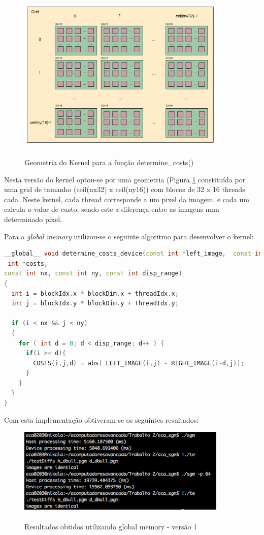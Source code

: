\documentclass[pdftex,12pt,a4paper]{report}
\begin{document}
\begin{figure}[!htb]
\center
 \includegraphics[width=100mm,scale=1]{DetermineCosts_v1_kernel.pdf}
 \caption{\\ Geometria do Kernel para a função determine\_costs()}
 \label{fig:DetermineCosts_v1_kernel}
\end{figure}

Nesta versão do kernel optou-se por uma geometria (Figura \ref{fig:DetermineCosts_v1_kernel}  constituída por uma grid de tamanho (ceil(nx\/32) x ceil(ny\/16)) com blocos de 32 x 16 threads cada.
Neste kernel, cada thread corresponde a um pixel da imagem, e cada um calcula o valor de custo, sendo este a diferença entre as imagens num determinado pixel.

Para a \textit{global memory} utilizou-se o seguinte algoritmo para desenvolver o kernel:

\begin{lstlisting}[language=c++, basicstyle=\scriptsize]
__global__ void determine_costs_device(const int *left_image,  const int *right_image,
 int *costs, 
const int nx, const int ny, const int disp_range)
{
  int i = blockIdx.x * blockDim.x + threadIdx.x;
  int j = blockIdx.y * blockDim.y + threadIdx.y;

  if (i < nx && j < ny)
  {
    for ( int d = 0; d < disp_range; d++ ) {
      if(i >= d){
        COSTS(i,j,d) = abs( LEFT_IMAGE(i,j) - RIGHT_IMAGE(i-d,j));
      }
    }
  }
}
\end{lstlisting} 

Com esta implementação obtiveram-se os seguintes resultados:

\begin{figure}[!htb]
\center
 \includegraphics[width=100mm,scale=1]{DetermineCostsv1globalresults.png}
 \caption{\\ Resultados obtidos utilizando global memory - versão 1}
 \label{fig:DetermineCostsv1globalresults}
\end{figure}
\end{document}
